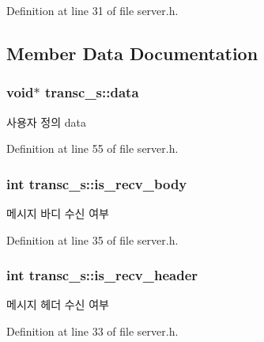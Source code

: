Definition at line 31 of file server.\-h.



\subsection{Member Data Documentation}
\hypertarget{structtransc__s_a7bef20277f46c5060534d45c0197e2c2}{
\subsubsection[{data}]{\setlength{\rightskip}{0pt plus 5cm}void$\ast$ transc\-\_\-s\-::data}}\label{structtransc__s_a7bef20277f46c5060534d45c0197e2c2}


사용자 정의 data 



Definition at line 55 of file server.\-h.

\hypertarget{structtransc__s_a933576e2cfbc542bc7eb4adef73891a9}{
\subsubsection[{is\-\_\-recv\-\_\-body}]{\setlength{\rightskip}{0pt plus 5cm}int transc\-\_\-s\-::is\-\_\-recv\-\_\-body}}\label{structtransc__s_a933576e2cfbc542bc7eb4adef73891a9}


메시지 바디 수신 여부 



Definition at line 35 of file server.\-h.

\hypertarget{structtransc__s_a684a0026e8ca2dd3519fcbc8d9c21135}{
\subsubsection[{is\-\_\-recv\-\_\-header}]{\setlength{\rightskip}{0pt plus 5cm}int transc\-\_\-s\-::is\-\_\-recv\-\_\-header}}\label{structtransc__s_a684a0026e8ca2dd3519fcbc8d9c21135}


메시지 헤더 수신 여부 



Definition at line 33 of file server.\-h.

